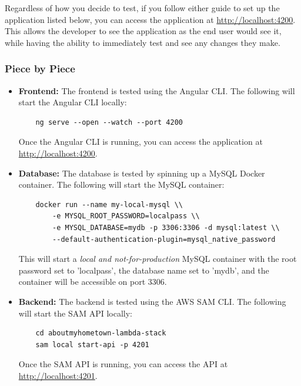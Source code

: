\documentclass[12pt]{article}
\begin{document}
Regardless of how you decide to test, if you follow either guide to set up the application listed below, you can access the application at \url{http://localhost:4200}. This allows the developer to see the application as the end user would see it, while having the ability to immediately test and see any changes they make.

\subsubsection{Piece by Piece}
\begin{itemize}
    \item \textbf{Frontend:} The frontend is tested using the Angular CLI. The following will start the Angular CLI locally:

          \begin{verbatim}
    ng serve --open --watch --port 4200
          \end{verbatim}

          Once the Angular CLI is running, you can access the application at \url{http://localhost:4200}.

    \item \textbf{Database:} The database is tested by spinning up a MySQL Docker container. The following will start the MySQL container:

          \begin{verbatim}
    docker run --name my-local-mysql \\
        -e MYSQL_ROOT_PASSWORD=localpass \\
        -e MYSQL_DATABASE=mydb -p 3306:3306 -d mysql:latest \\
        --default-authentication-plugin=mysql_native_password
        \end{verbatim}

          This will start a \textit{local and not-for-production} MySQL container with the root password set to 'localpass', the database name set to 'mydb', and the container will be accessible on port 3306.

    \item \textbf{Backend:} The backend is tested using the AWS SAM CLI. The following will start the SAM API locally:

          \begin{verbatim}
    cd aboutmyhometown-lambda-stack
    sam local start-api -p 4201
          \end{verbatim}

          Once the SAM API is running, you can access the API at \url{http://localhost:4201}.
\end{itemize}
\end{document}
